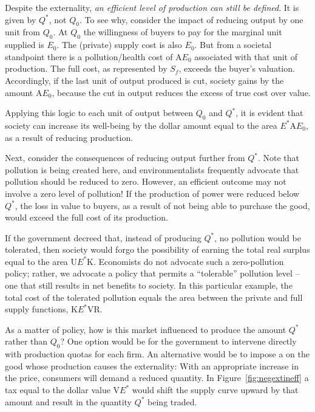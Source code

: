 Despite the externality, \textit{an efficient level of production can still be defined}. It is given by $Q^*$, not $Q_0$. To see why, consider the impact of reducing output by one unit from $Q_0$. At $Q_0$ the willingness of buyers to pay for the marginal unit supplied is $E_0$. The (private) supply cost is also $E_0$. But from a societal standpoint there is a pollution/health cost of A$E_0$ associated with that unit of production. The full cost, as represented by $S_f$, exceeds the buyer's valuation. Accordingly, if the last unit of output produced is cut, society gains by the amount A$E_0$, because the cut in output reduces the excess of true cost over value.

Applying this logic to each unit of output between $Q_0$ and $Q^*$, it is evident that society can increase its well-being by the dollar amount equal to the area $E^*$A$E_0$, as a result of reducing production. 

Next, consider the consequences of reducing output further from $Q^*$. Note that pollution is being created here, and environmentalists frequently advocate that pollution should be reduced to zero. However, an efficient outcome may not involve a zero level of pollution! If the production of power were reduced below $Q^*$, the loss in value to buyers, as a result of not being able to purchase the good, would exceed the full cost of its production.

If the government decreed that, instead of producing $Q^*$, no pollution would be tolerated, then society would forgo the possibility of earning the total real surplus equal to the area U$E^*$K. Economists do not advocate such a zero-pollution policy; rather, we advocate a policy that permits a ``tolerable'' pollution level -- one that still results in net benefits to society. In this particular example, the total cost of the tolerated pollution equals the area between the private and full supply functions, K$E^*$VR.

As a matter of policy, how is this market influenced to produce the amount $Q^*$ rather than $Q_0$? One option would be for the government to intervene directly with production quotas for each firm. An alternative would be to impose a  on the good whose production causes the externality: With an appropriate increase in the price, consumers will demand a reduced quantity. In Figure~\ref{fig:negextineff} a tax equal to the dollar value V$E^*$ would shift the supply curve upward by that amount and result in the quantity $Q^*$ being traded.

